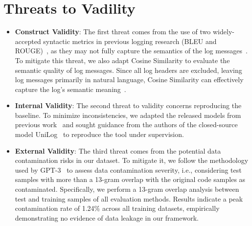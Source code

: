 \section{Threats to Vadility}
\label{sec: vadility}
\begin{itemize}
    \item \textbf{Construct Validity}: The first threat comes from the use of two widely-accepted syntactic metrics in previous logging research (BLEU and ROUGE)~\cite{xie2024fastlog, Xu2024UniLogAL, He2018CharacterizingTN, Ding2023LoGenTextPlusIN}, as they may not fully capture the semantics of the log messages~\cite{Gros2020CodeTC, Roy2021ReassessingAE}. To mitigate this threat, we also adapt Cosine Similarity to evaluate the semantic quality of log messages.  Since all log headers are excluded, leaving log messages primarily in natural language, Cosine Similarity can effectively capture the log's semantic meaning~\cite{Salton1975AVS}.
    \item \textbf{Internal Validity}: The second threat to validity concerns reproducing the baseline. To minimize inconsistencies, we adapted the released models from previous work~\cite{xie2024fastlog, Mastropaolo2022UsingDL, Mastropaolo2023LogSG} and sought guidance from the authors of the closed-source model UniLog~\cite{Xu2024UniLogAL} to reproduce the tool under supervision.
    \item \textbf{External Validity}: 
    {The third threat comes from the potential data contamination risks in our dataset. 
    To mitigate it, we follow the methodology used by GPT-3~\cite{Brown2020LanguageMA} to assess data contamination severity, i.e., considering test samples with more than a 13-gram overlap with the original code samples as contaminated.
    Specifically, we perform a 13-gram overlap analysis between test and training samples of all evaluation methods. Results indicate a peak contamination rate of 1.24\% across all training datasets, empirically demonstrating no evidence of data leakage in our framework.} 
\end{itemize}


